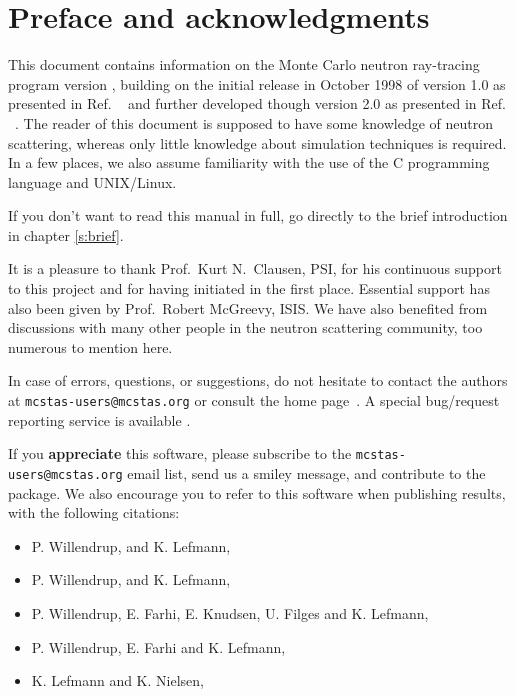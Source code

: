 

\chapter*{Preface and acknowledgments}
This document contains information on the Monte Carlo neutron
ray-tracing program \MCS version \version, building on the initial
release in October 1998 of version 1.0 as presented in
Ref. ~\cite{nn_10_20} and further developed though version 2.0 as
presented in Ref. ~\cite{mcs_ppf}.
The reader of this document is supposed to have some knowledge of neutron scattering,
whereas only little knowledge about simulation techniques is
required. In a few places, we also assume familiarity with the
use of the C programming language and UNIX/Linux.

If you don't want to read this manual in full, go directly to the brief introduction in chapter \ref{s:brief}.

It is a pleasure to thank Prof.~Kurt N.~Clausen, PSI, for his continuous
support to this project and for having initiated \MCS in the first
place. Essential support has also been given by Prof.~Robert McGreevy, ISIS.
We have also benefited from discussions with many other people in the neutron scattering
community, too numerous to mention here.

In case of errors, questions, or suggestions, do not hesitate to
contact the authors at \verb+mcstas-users@mcstas.org+
or consult the \MCS home page~\cite{mcstas_webpage}.
A special bug/request reporting service is available \cite{github_issue_webpage}.

If you \textbf{appreciate} this software, please subscribe to the \verb+mcstas-users@mcstas.org+ email list, send us a smiley message, and contribute to the package. We also encourage you to refer to this software when publishing results, with the following citations:
\begin{itemize}
\item{P. Willendrup, and K. Lefmann, }
\item{P. Willendrup, and K. Lefmann, }
\item{P. Willendrup, E. Farhi, E. Knudsen, U. Filges and K. Lefmann,
    }
\item{P. Willendrup, E. Farhi and K. Lefmann, }
\item{K. Lefmann and K. Nielsen, }
\end{itemize}


